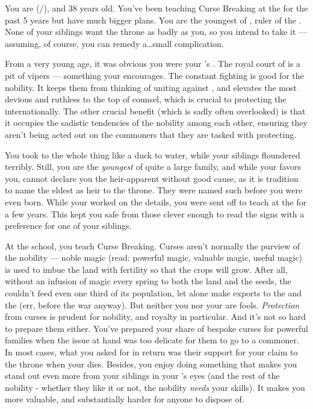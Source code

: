 \documentclass[char]{GL2020}
\begin{document}
\name{\cPrince{}}

You are \cPrince{\full} (\cPrince{\they}/\cPrince{\them}), and 38 years old. You've been teaching Curse Breaking at the \pSchool{} for the past 5 years but have much bigger plans. You are the youngest \cPrince{\offspring} of \cQueen{\full}, ruler of the \pFarm{}. None of your siblings want the throne as badly as you, so you intend to take it — assuming, of course, you can remedy a\ldots{}small complication.

From a very young age, it was obvious you were your \cQueen{\parent}'s \cPrince{\offspring}. The royal court of \pFarm{} is a pit of vipers — something your \cQueen{\parent} encourages. The constant fighting is good for the nobility. It keeps them from thinking of uniting against \cQueen{\them}, and elevates the most devious and ruthless to the top of \cQueen{\their} counsel, which is crucial to protecting the \pFarm{} internationally. The other crucial benefit (which is sadly often overlooked) is that it occupies the sadistic tendencies of the nobility among each other, ensuring they aren’t being acted out on the commoners that they are tasked with protecting. 

You took to the whole thing like a duck to water, while your siblings floundered terribly. Still, you are the \emph{youngest} of quite a large family, and while your \cQueen{\parent} favors you, \cQueen{\they} cannot declare you the heir-apparent without good cause, as it is tradition to name the eldest as heir to the throne. They were named such before you were even born.  While your \cQueen{\parent} worked on the details, you were sent off to teach at the \pSchool{} for a few years. This kept you safe from those clever enough to read the signs with a preference for one of your siblings.

At the school, you teach Curse Breaking. Curses aren't normally the purview of the nobility — noble magic (read: powerful magic, valuable magic, useful magic) is used to imbue the land with fertility so that the crops will grow. After all, without an infusion of magic every spring to both the land and the seeds, the \pFarm{} couldn't feed even one third of its population, let alone make exports to the \pTech{} and the \pShip{} (err, before the war anyway). But neither you nor your \cQueen{\parent} are fools. \emph{Protection} from curses is prudent for nobility, and royalty in particular. And it's not so hard to prepare them either. You've prepared your share of bespoke curses for powerful families when the issue at hand was too delicate for them to go to a commoner. In most cases, what you asked for in return was their support for your claim to the throne when your \cQueen{\parent} dies. Besides, you enjoy doing something that makes you stand out even more from your siblings in your \cQueen{\parent}’s eyes (and the rest of the nobility - whether they like it or not, the nobility \emph{needs} your skills).  It makes you more valuable, and substantially harder for anyone to dispose of.
\end{document}
